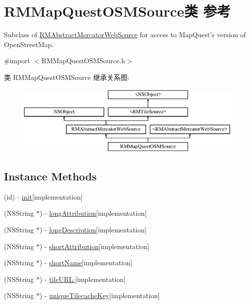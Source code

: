 \hypertarget{interface_r_m_map_quest_o_s_m_source}{\section{R\-M\-Map\-Quest\-O\-S\-M\-Source类 参考}
\label{interface_r_m_map_quest_o_s_m_source}
}


Subclass of \hyperlink{interface_r_m_abstract_mercator_web_source}{R\-M\-Abstract\-Mercator\-Web\-Source} for access to Map\-Quest's version of Open\-Street\-Map.  




{\ttfamily \#import $<$R\-M\-Map\-Quest\-O\-S\-M\-Source.\-h$>$}

类 R\-M\-Map\-Quest\-O\-S\-M\-Source 继承关系图\-:\begin{figure}[H]
\begin{center}
\leavevmode
\includegraphics[height=3.425076cm]{interface_r_m_map_quest_o_s_m_source}
\end{center}
\end{figure}
\subsection*{Instance Methods}
\begin{DoxyCompactItemize}
\item 
(id) -\/ \hyperlink{interface_r_m_map_quest_o_s_m_source_aecd8d0a7ca60bc224ee43f8ad933fb1b}{init}{\ttfamily  \mbox{[}implementation\mbox{]}}
\item 
(N\-S\-String $\ast$) -\/ \hyperlink{interface_r_m_map_quest_o_s_m_source_a42722a15d1f14e114d2f4cd8de4010d6}{long\-Attribution}{\ttfamily  \mbox{[}implementation\mbox{]}}
\item 
(N\-S\-String $\ast$) -\/ \hyperlink{interface_r_m_map_quest_o_s_m_source_ab56b7a7914bb63cbec37f5e0cf556efd}{long\-Description}{\ttfamily  \mbox{[}implementation\mbox{]}}
\item 
(N\-S\-String $\ast$) -\/ \hyperlink{interface_r_m_map_quest_o_s_m_source_a14a58e74d28b38df3c93dfae7a7f6633}{short\-Attribution}{\ttfamily  \mbox{[}implementation\mbox{]}}
\item 
(N\-S\-String $\ast$) -\/ \hyperlink{interface_r_m_map_quest_o_s_m_source_adb22b17b97840aa7bc2170e896b464d9}{short\-Name}{\ttfamily  \mbox{[}implementation\mbox{]}}
\item 
(N\-S\-String $\ast$) -\/ \hyperlink{interface_r_m_map_quest_o_s_m_source_afb62c2d80e8f350ff3f1049f63e76b3b}{tile\-U\-R\-L\-:}{\ttfamily  \mbox{[}implementation\mbox{]}}
\item 
(N\-S\-String $\ast$) -\/ \hyperlink{interface_r_m_map_quest_o_s_m_source_ac5f1fbdc160544d60e9706b4e8e0c6a5}{unique\-Tilecache\-Key}{\ttfamily  \mbox{[}implementation\mbox{]}}
\end{DoxyCompactItemize}
